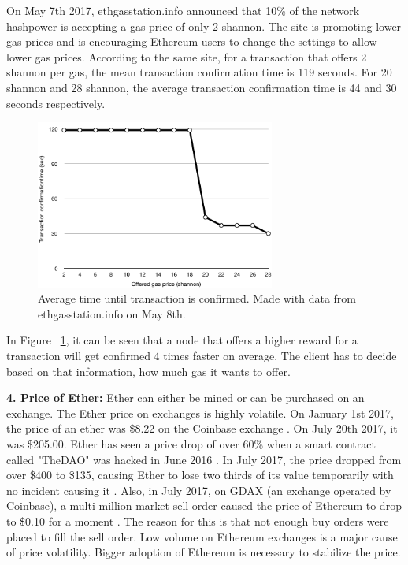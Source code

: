 On May 7th 2017, ethgasstation.info announced \cite{ETHGasStationAnnouncement} that 10\% of the network hashpower is accepting a gas price of only 2 shannon. The site is promoting lower gas prices and is encouraging Ethereum users to change the settings to allow lower gas prices. According to the same site, for a transaction that offers 2 shannon per gas, the mean transaction confirmation time is 119 seconds. For 20 shannon and 28 shannon, the average transaction confirmation time is 44 and 30 seconds respectively.

\begin{figure}[H]
\centering
\includegraphics[width=0.7\textwidth]{gas-vs-transaction-time.png}
\caption{Average time until transaction is confirmed. Made with data from ethgasstation.info on May 8th.}
\label{fig:gas}
\end{figure}

In Figure ~\ref{fig:gas}, it can be seen that a node that offers a higher reward for a transaction will get confirmed 4 times faster on average. The client has to decide based on that information, how much gas it wants to offer.

\textbf{4. Price of Ether:} Ether can either be mined or can be purchased on an exchange. The Ether price on exchanges is highly volatile. On January 1st 2017, the price of an ether was \$8.22 on the Coinbase exchange \cite{Coinbase}. On July 20th 2017, it was \$205.00. Ether has seen a price drop of over 60\% when a smart contract called "TheDAO" was hacked in June 2016 \cite{DAO}. In July 2017, the price dropped from over \$400 to \$135, causing Ether to lose two thirds of its value temporarily with no incident causing it \cite{Coinbase}. Also, in July 2017, on GDAX (an exchange operated by Coinbase), a multi-million market sell order caused the price of Ethereum to drop to \$0.10 for a moment \cite{EthereumCent}. The reason for this is that not enough buy orders were placed to fill the sell order. Low volume on Ethereum exchanges is a major cause of price volatility. Bigger adoption of Ethereum is necessary to stabilize the price.

